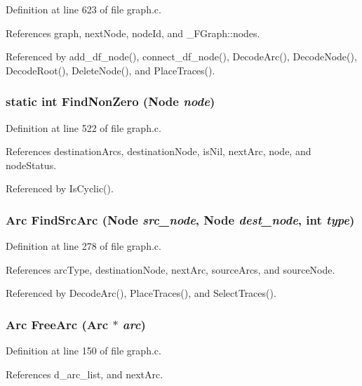 Definition at line 623 of file graph.c.

References graph, next\-Node, node\-Id, and \_\-FGraph::nodes.

Referenced by add\_\-df\_\-node(), connect\_\-df\_\-node(), Decode\-Arc(), Decode\-Node(), Decode\-Root(), Delete\-Node(), and Place\-Traces().
\subsubsection{\setlength{\rightskip}{0pt plus 5cm}static int Find\-Non\-Zero (\bf{Node} {\em node})\hspace{0.3cm}{\tt  [static]}}\label{graph_8c_6ad7be853868991064d3beb91f4ef225}




Definition at line 522 of file graph.c.

References destination\-Arcs, destination\-Node, is\-Nil, next\-Arc, node, and node\-Status.

Referenced by Is\-Cyclic().
\subsubsection{\setlength{\rightskip}{0pt plus 5cm}\bf{Arc} Find\-Src\-Arc (\bf{Node} {\em src\_\-node}, \bf{Node} {\em dest\_\-node}, int {\em type})}\label{graph_8c_936ce714faf05a0e434203bfa785b5ec}




Definition at line 278 of file graph.c.

References arc\-Type, destination\-Node, next\-Arc, source\-Arcs, and source\-Node.

Referenced by Decode\-Arc(), Place\-Traces(), and Select\-Traces().
\subsubsection{\setlength{\rightskip}{0pt plus 5cm}\bf{Arc} Free\-Arc (\bf{Arc} $\ast$ {\em arc})}\label{graph_8c_3459b0aafa62f3a05b5fbdfd7cc6fdf4}




Definition at line 150 of file graph.c.

References d\_\-arc\_\-list, and next\-Arc.

